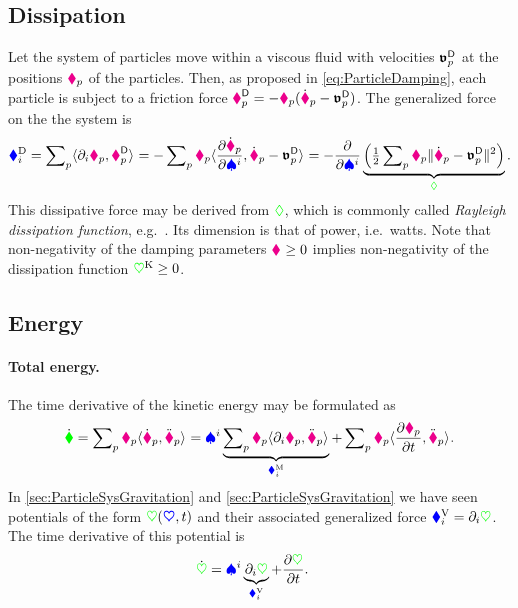 \subsection{Dissipation}
Let the system of particles move within a viscous fluid with velocities $\fluidVel{\PidxI}$ at the positions $\particlePos{\PidxI}$ of the particles.
Then, as proposed in \eqref{eq:ParticleDamping}, each particle is subject to a friction force $\particleForceDiss{\PidxI} = -\particleDamping{\PidxI} (\particlePosd{\PidxI} - \fluidVel{\PidxI})$.
The generalized force on the the system is
\begin{align}
 \genForceDissCoeff{\LidxI}
 = \sumParticles \sProd{\dirDiff{\LidxI} \particlePos{\PidxI}}{\particleForceDiss{\PidxI}}
 = -\sumParticles \particleDamping{\PidxI} \sProd{\pdiff[\particlePosd{\PidxI}]{\sysVelCoeff{\LidxI}}}{\particlePosd{\PidxI} - \fluidVel{\PidxI}}
 = -\pdiff{\sysVelCoeff{\LidxI}} \underbrace{\Big( \tfrac{1}{2} \sumParticles \particleDamping{\PidxI} \norm{\particlePosd{\PidxI} - \fluidVel{\PidxI}}^2 \Big)}_{\dissFkt}.
\end{align}
This dissipative force may be derived from $\dissFkt$, which is commonly called \textit{Rayleigh dissipation function}, e.g.\ \cite[p.\ 24]{Goldstein:ClassicalMechanics}.
Its dimension is that of power, i.e.\ watts.
Note that non-negativity of the damping parameters $\particleStiffness{} \geq 0$ implies non-negativity of the dissipation function $\potentialStiff \geq 0$.


\subsection{Energy}
\paragraph{Total energy.}
The time derivative of the kinetic energy may be formulated as
\begin{align}
 \dot{\kineticEnergy} = \sumParticles \particleMass{\PidxI} \sProd{\particlePosd{\PidxI}}{\particlePosdd{\PidxI}} 
 = \sysVelCoeff{\LidxI} \underbrace{\sumParticles \particleMass{\PidxI} \sProd{\dirDiff{\LidxI}\particlePos{\PidxI}}{\particlePosdd{\PidxI}}}_{\genForceInertiaCoeff{\LidxI}}
 + \sumParticles \particleMass{\PidxI} \sProd{\pdiff[\particlePos{\PidxI}]{t}}{\particlePosdd{\PidxI}}.
\end{align}	
In \autoref{sec:ParticleSysGravitation} and \autoref{sec:ParticleSysGravitation} we have seen potentials of the form $\potentialEnergy(\sysCoord, t)$ and their associated generalized force $\genForcePotentialCoeff{\LidxI} = \dirDiff{\LidxI} \potentialEnergy$.
The time derivative of this potential is
\begin{align}
 \dot{\potentialEnergy} &= \sysVelCoeff{\LidxI} \underbrace{\dirDiff{\LidxI} \potentialEnergy}_{\genForcePotentialCoeff{\LidxI}} + \pdiff[\potentialEnergy]{t}.
\end{align}

